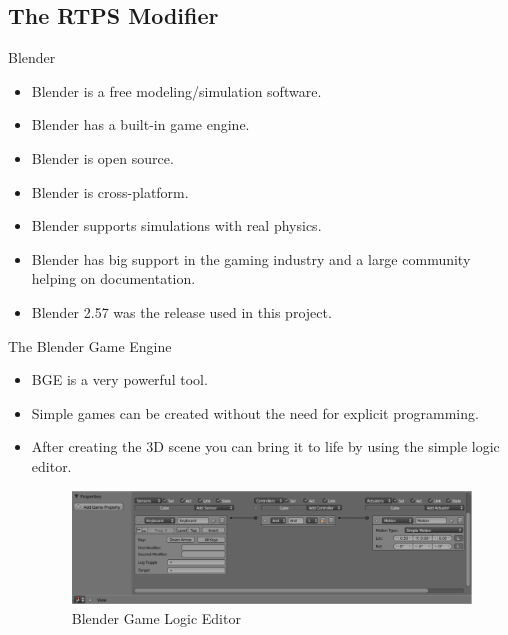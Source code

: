 \documentclass[red]{beamer}
\begin{document}
\subsection{The RTPS Modifier}

\begin{frame}{Blender}
	\begin{itemize}
		\pause \item Blender is a free modeling/simulation software.
		\pause \item Blender has a built-in game engine.
		\pause \item Blender is open source.
		\pause \item Blender is cross-platform.
		\pause \item Blender supports simulations with real physics.
		\pause \item Blender has big support in the gaming industry and a large community helping on documentation.
		\pause \item Blender 2.57 was the release used in this project.
	\end{itemize}
\end{frame}

\begin{frame}{The Blender Game Engine}
	\begin{itemize}
		\pause \item BGE is a very powerful tool.
		\pause \item Simple games can be created without the need for explicit programming.
		\pause \item After creating the 3D scene you can bring it to life by using the simple logic editor.
			\pause
			\begin{figure}[htbp]
			\begin{center}
			\includegraphics[scale=0.25]{../figures/logic.pdf}
			\caption{Blender Game Logic Editor}
			\label{logicEditor}
			\end{center}
			\end{figure}
	\end{itemize}
\end{frame}
\end{document}
